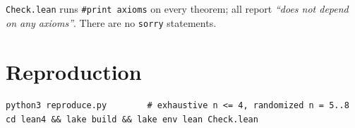 \documentclass[11pt]{article}
\begin{document}
\texttt{Check.lean} runs \texttt{\#print axioms} on every theorem; all report
\emph{``does not depend on any axioms''}. There are no \texttt{sorry} statements.

\section{Reproduction}

\begin{verbatim}
python3 reproduce.py        # exhaustive n <= 4, randomized n = 5..8
cd lean4 && lake build && lake env lean Check.lean
\end{verbatim}
\end{document}
